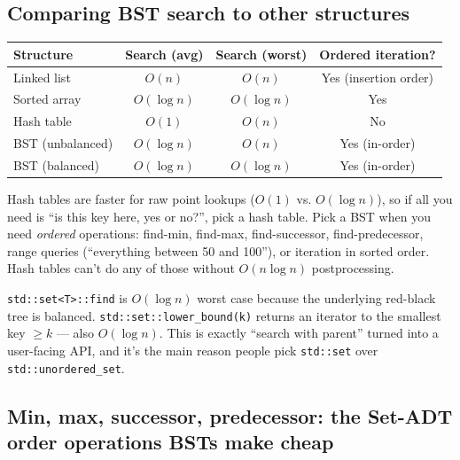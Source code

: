 \documentclass[11pt]{article}
\begin{document}
\subsection*{Comparing BST search to other structures}

\begin{center}
\begin{tabular}{|l|c|c|c|}
\hline
\textbf{Structure} & \textbf{Search (avg)} & \textbf{Search (worst)} & \textbf{Ordered iteration?} \\
\hline
Linked list          & $O(n)$       & $O(n)$       & Yes (insertion order) \\
Sorted array         & $O(\log n)$  & $O(\log n)$  & Yes \\
Hash table           & $O(1)$       & $O(n)$       & No \\
BST (unbalanced)     & $O(\log n)$  & $O(n)$       & Yes (in-order) \\
BST (balanced)       & $O(\log n)$  & $O(\log n)$  & Yes (in-order) \\
\hline
\end{tabular}
\end{center}

\begin{ideabox}
Hash tables are faster for raw point lookups ($O(1)$ vs. $O(\log n)$),
so if all you need is ``is this key here, yes or no?'', pick a
hash table. Pick a BST when you need \emph{ordered} operations:
find-min, find-max, find-successor, find-predecessor, range
queries (``everything between 50 and 100''), or iteration in
sorted order. Hash tables can't do any of those without
$O(n \log n)$ postprocessing.
\end{ideabox}

\begin{notebox}
\texttt{std::set<T>::find} is $O(\log n)$ worst case because
the underlying red-black tree is balanced.
\texttt{std::set::lower\_bound(k)} returns an iterator to the
smallest key $\geq k$ --- also $O(\log n)$. This is exactly
``search with parent'' turned into a user-facing API, and it's
the main reason people pick \texttt{std::set} over
\texttt{std::unordered\_set}.
\end{notebox}

\subsection*{Min, max, successor, predecessor: the Set-ADT order operations BSTs make cheap}
\end{document}
